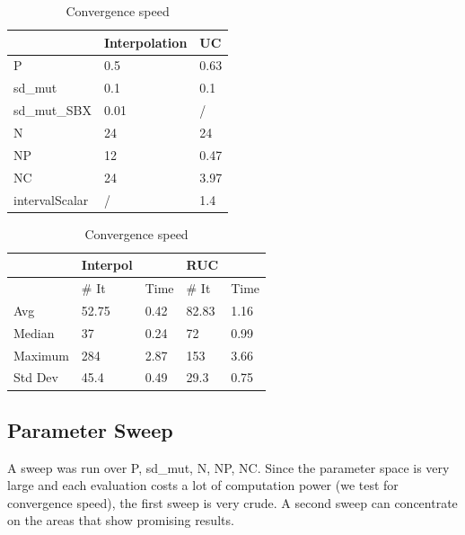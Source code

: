 \begin{table}[!htb]
	\caption{Convergence of the GAs}
	\begin{minipage}{.5\linewidth}
		\caption{Parameters}
		\centering
		\begin{tabular}{ | l | l | l | }
			\hline
			& Interpolation 	 & UC \\
			\hline
			P			& 0.5	 &  0.63  \\
			sd_mut 		& 0.1	 & 0.1	\\
			sd_mut_SBX	& 0.01	 &  /  \\
			N        	& 24 	 & 24	\\
			NP 			& 12	 &  0.47\\
			NC 			& 24	 & 3.97 \\
			intervalScalar & /	 &  1.4 \\  
			\hline
		\end{tabular}
	\end{minipage}%
	\begin{minipage}{.5\linewidth}
		\centering
		\caption{Convergence speed}
		\begin{tabular}{ |l||l|l|| l | l |}
				\hline
							& Interpol &      & RUC  &\\
				\hline
							& \# It & Time 	& \# It & Time	\\
				\hline
				Avg			& 52.75	 	&  0.42  	& 82.83		 & 1.16		\\
				Median		& 37		&  0.24		& 72		& 0.99		\\
				Maximum		& 284	 	&  2.87		& 153		& 3.66		\\
				Std Dev		& 45.4	 	&  0.49 	& 29.3		& 0.75		\\
				\hline
		\end{tabular}
	\end{minipage} 
\end{table}


\subsection{Parameter Sweep}
A sweep was run over P, sd_mut, N, NP, NC. Since the parameter space is very large and each evaluation costs a lot of computation power (we test for convergence speed), the first sweep is very crude.
A second sweep can concentrate on the areas that show promising results.

